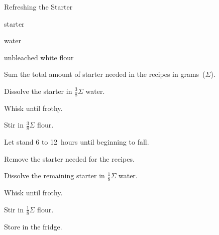 \begin{recipe}{Refreshing the Starter}{}{}

\begin{ingredients}
\item starter
\item water
\item unbleached white flour
\end{ingredients}

\begin{directions}
\item Sum the total amount of starter needed in the recipes in grams~($\Sigma$).
\item Dissolve the starter in $\frac{3}{8}\Sigma$ water.
\item Whisk until frothy. 
\item Stir in $\frac{3}{8}\Sigma$ flour.
\item Let stand 6 to 12~hours until beginning to fall.
\item Remove the starter needed for the recipes.
\item Dissolve the remaining starter in $\frac{1}{8}\Sigma$ water.
\item Whisk until frothy. 
\item Stir in $\frac{1}{8}\Sigma$ flour.
\item Store in the fridge.
\end{directions}

\end{recipe}
